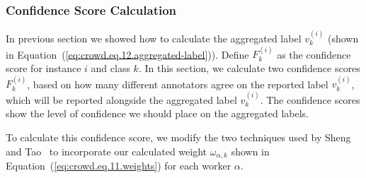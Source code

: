 \subsubsection{Confidence Score Calculation}

In previous section we showed how to calculate the aggregated label $v_k^{(i)} $ (shown in Equation~(\ref{eq:crowd.eq.12.aggregated-label})). Define $F_k^{(i)} $ as the confidence score for instance $i $ and class $k $. In this section, we calculate two confidence scores $F_k^{(i)} $, based on how many different annotators agree on the reported label $v_k^{(i)} $, which will be reported alongside the aggregated label $v_k^{(i)} $. The confidence scores show the level of confidence we should place on the aggregated labels.

To calculate this confidence score, we modify the two techniques used by Sheng~\cite{sheng_Majority_2019} and Tao~\cite{tao_Label_2020} to incorporate our calculated weight $\omega_{\alpha,k} $ shown in Equation~(\ref{eq:crowd.eq.11.weights})  for each worker $\alpha $.

